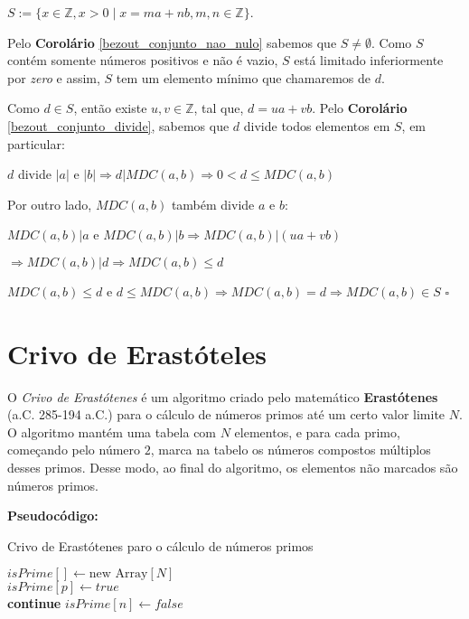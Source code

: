 $S := \{x\in\mathbb{Z}, x>0 \mid x = ma + nb, m,n\in \mathbb{Z}\}$.

Pelo \textbf{Corolário} \autoref{bezout_conjunto_nao_nulo} sabemos que $S \neq \emptyset$. Como $S$ contém somente números positivos e não é vazio, 
$S$ está limitado inferiormente por \textit{zero} e assim, $S$ tem um elemento mínimo que chamaremos de $d$.

Como $d \in S$, então existe $u, v\in \mathbb{Z}$, tal que, $d = ua + vb$. Pelo \textbf{Corolário} \autoref{bezout_conjunto_divide}, sabemos que $d$ divide todos elementos em $S$, em particular:

$d$ divide $|a|$ e $|b| \Rightarrow d|MDC(a,b) \Rightarrow 0 < d \leq MDC(a,b)$

Por outro lado, $MDC(a,b)$ também divide $a$ e $b$:

$MDC(a,b)|a$ e $MDC(a,b)|b \Rightarrow MDC(a,b)|(ua + vb)$

$ \Rightarrow MDC(a,b)|d \Rightarrow MDC(a,b) \leq d$

$MDC(a,b)\leq d$ e $d \leq MDC(a,b) \Rightarrow MDC(a,b) = d \Rightarrow MDC(a,b) \in S$ $\square$






\section{Crivo de Erastóteles}

O \textit{Crivo de Erastótenes} é um algoritmo criado pelo matemático \textbf{Erastótenes} (a.C. 285-194 a.C.) para o cálculo de números primos
até um certo valor limite $N$.
O algoritmo mantém uma tabela com $N$ elementos, e para cada primo, começando pelo número $2$, marca na tabelo os números compostos múltiplos desses primos.
Desse modo, ao final do algoritmo, os elementos não marcados são números primos.\\
\clearpage

\textbf{Pseudocódigo:}
\begin{algorithm}
\caption{Crivo de Erastótenes paro o cálculo de números primos}\label{crivo_erastotenes}
\begin{algorithmic}[1]
\State $isPrime[] \gets \text{new Array}[N]$ 
\\
\State $isPrime[p] \gets true$
\EndFor
\\
\State \textbf{continue}
\EndIf
{}
\State $isPrime[n] \gets false$
\EndFor
\EndFor
\\
\State {}
\EndProcedure
\end{algorithmic}
\end{algorithm}

